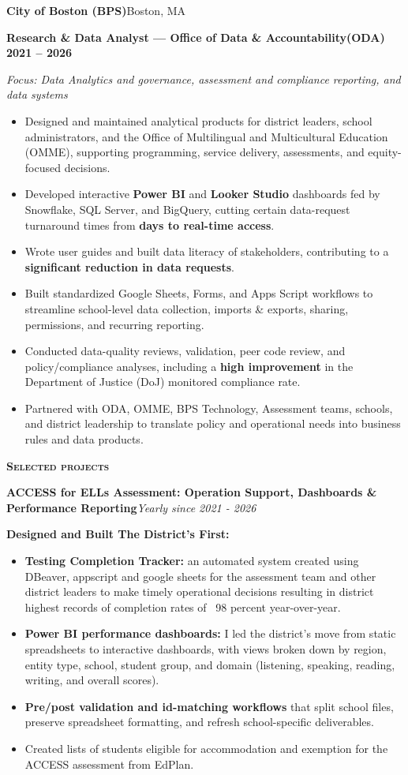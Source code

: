 \documentclass[10pt,letterpaper]{article}
\newcommand{\job}[4]{%
  \par\vspace{4pt}
  {\color{navy}\bfseries\large #1}\hfill{\color{muted}\small #2}\par\vspace{1pt}
  {\color{accent}\bfseries #3}\hfill{\small\bfseries\color{ink} #4}\par\vspace{1pt}}
\newcommand{\project}[2]{%
  \par\vspace{5pt}
  {\bfseries\color{navy} #1}\hfill{\small\color{muted}\itshape #2}\par}
\begin{document}
\job{City of Boston (BPS)}{Boston, MA}
    {Research \& Data Analyst --- Office of Data \& Accountability(ODA)}{2021 -- 2026}
{\small\itshape\color{muted} Focus: Data Analytics and governance, assessment and compliance reporting, and data systems}
\begin{itemize}
  \item Designed and maintained analytical products for district leaders, school administrators, and the Office of Multilingual and Multicultural Education (OMME), supporting programming, service delivery, assessments, and equity-focused decisions.
  \item Developed interactive \textbf{Power BI} and \textbf{Looker Studio} dashboards fed by Snowflake, SQL Server, and BigQuery, cutting certain data-request turnaround times from \textbf{days to real-time access}.
  \item Wrote user guides and built data literacy of stakeholders, contributing to a \textbf{significant reduction in data requests}.
  \item Built standardized Google Sheets, Forms, and Apps Script workflows to streamline school-level data collection, imports \& exports, sharing, permissions, and recurring reporting.
  \item Conducted data-quality reviews, validation, peer code review, and policy/compliance analyses, including a \textbf{high improvement} in the Department of Justice (DoJ) monitored compliance rate.
  \item Partnered with ODA, OMME, BPS Technology, Assessment teams, schools, and district leadership to translate policy and operational needs into business rules and data products.
\end{itemize}

\vspace{4pt}
{\color{accent}\bfseries\small\scshape Selected projects}

\project{ACCESS for ELLs Assessment: Operation Support, Dashboards \& Performance Reporting}{Yearly since 2021 - 2026}
{\small \textbf{Designed and Built The District's First:}}
\begin{itemize}
  \item \textbf{Testing Completion Tracker:} an automated system created using DBeaver, appscript and google sheets for the assessment team and other district leaders to make timely operational decisions resulting in district highest records of completion rates of ~98 percent year-over-year.
  \item \textbf{Power BI performance dashboards:} I led the district's move from static spreadsheets to interactive dashboards, with views broken down by region, entity type, school, student group, and domain (listening, speaking, reading, writing, and overall scores).
  \item \textbf{Pre/post validation and id-matching workflows} that split school files, preserve spreadsheet formatting, and refresh school-specific deliverables.
  \item Created lists of students eligible for accommodation and exemption for the ACCESS assessment from EdPlan.
\end{itemize}
\end{document}
